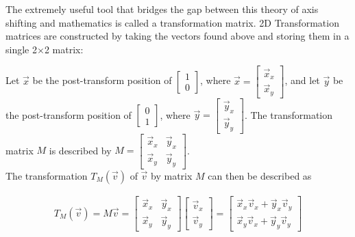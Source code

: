 \documentclass[12pt, a4paper]{article}
\begin{document}
\pagebreak

The extremely useful tool that bridges the gap between this theory of axis
shifting and mathematics is called a transformation matrix. 2D Transformation
matrices are constructed by taking the vectors found above and storing them in a
single 2$\times$2 matrix:

Let $\vec{x}$ be the post-transform position of $\begin{bmatrix} 1 \\ 0
\end{bmatrix}$, where $\vec{x} = \begin{bmatrix} \vec{x}_x \\ \vec{x}_y
\end{bmatrix}$, and let $\vec{y}$ be the post-transform position of
$\begin{bmatrix} 0 \\ 1 \end{bmatrix}$, where $\vec{y} =
\begin{bmatrix}\vec{y}_x \\ \vec{y}_y \end{bmatrix}$. The transformation matrix
$M$ is described by $ M = \begin{bmatrix} \vec{x}_x & \vec{y}_x \\
        \vec{x}_y & \vec{y}_y
\end{bmatrix}$.\\

The transformation $T_M(\vec{v})$ of $\vec{v}$ by matrix $M$ can then be
described as

\begin{align*}
    T_M(\vec{v}) = M\vec{v} = \begin{bmatrix} 
        \vec{x}_x & \vec{y}_x \\
        \vec{x}_y & \vec{y}_y
    \end{bmatrix}
    \begin{bmatrix}
        \vec{v}_x \\
        \vec{v}_y
    \end{bmatrix}
    =
    \begin{bmatrix}
        \vec{x}_x\vec{v}_x + \vec{y}_x\vec{v}_y \\
        \vec{x}_y\vec{v}_x + \vec{y}_y\vec{v}_y
    \end{bmatrix}
\end{align*}
\end{document}
